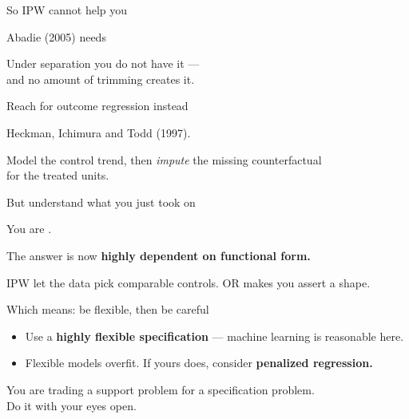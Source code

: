 \documentclass[aspectratio=169,11pt]{beamer}
\begin{document}
\begin{frame}{So IPW cannot help you}
\vspace{1.6em}
\begin{center}
\Large
Abadie (2005) needs 
\end{center}
\vspace{1.2em}
\begin{center}
Under separation you do not have it --- \\ and no amount of trimming creates it.
\end{center}
\end{frame}

\begin{frame}{Reach for outcome regression instead}
\vspace{1.4em}
\begin{center}
\Large
Heckman, Ichimura and Todd (1997).
\end{center}
\vspace{1.2em}
\begin{center}\color{warmgray}
Model the control trend, then \textit{impute} the missing counterfactual \\ for the treated units.
\end{center}
\end{frame}

\begin{frame}{But understand what you just took on}
\vspace{1.4em}
\begin{center}
\Large
You are .
\end{center}
\vspace{1.2em}
\begin{center}
The answer is now \textbf{highly dependent on functional form.}
\end{center}
\vspace{1em}
\begin{center}\color{warmgray}
IPW let the data pick comparable controls. \;OR makes you assert a shape.
\end{center}
\end{frame}

\begin{frame}{Which means: be flexible, then be careful}
\vspace{1.2em}
\begin{itemize}\setlength\itemsep{0.8em}
  \item Use a \textbf{highly flexible specification} --- machine learning is reasonable here.
  \item Flexible models overfit. \;If yours does, consider \textbf{penalized regression.}
\end{itemize}
\vspace{1.2em}
\begin{center}\color{warmgray}
You are trading a support problem for a specification problem. \\ Do it with your eyes open.
\end{center}
\end{frame}
\end{document}
